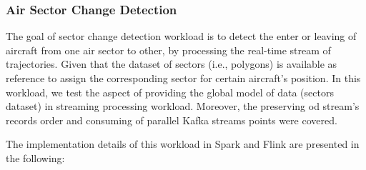 \documentclass[]{article}
\begin{document}
\subsubsection{Air Sector Change Detection}

The goal of sector change detection workload is to detect the  enter or leaving of aircraft from one air sector to other, by processing the real-time stream of trajectories. Given that the dataset of sectors (i.e., polygons) is available as reference to assign the corresponding sector for certain aircraft's position. In this workload, we test the aspect of providing the  global model of data (sectors dataset) in streaming processing workload. Moreover, the preserving od stream's records order and consuming of parallel Kafka streams points were covered.
 
 The implementation details of this workload in Spark and Flink are presented in the following: 
 
\end{document}
